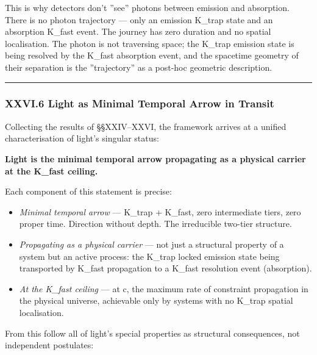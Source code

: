 \documentclass[12pt,a4paper]{article}
\begin{document}
This is why detectors don't ''see'' photons between emission and absorption. There is no photon trajectory --- only an emission K\_trap state and an absorption K\_fast event. The journey has zero duration and no spatial localisation. The photon is not traversing space; the K\_trap emission state is being resolved by the K\_fast absorption event, and the spacetime geometry of their separation is the ''trajectory'' as a post-hoc geometric description.

\begin{center}
\rule{0.5\textwidth}{0.4pt}
\end{center}

\subsubsection{XXVI.6 Light as Minimal Temporal Arrow in Transit}

Collecting the results of §§XXIV--XXVI, the framework arrives at a unified characterisation of light's singular status:

\textbf{Light is the minimal temporal arrow propagating as a physical carrier at the K\_fast ceiling.}

Each component of this statement is precise:

\begin{itemize}
    \item \emph{Minimal temporal arrow} --- K\_trap + K\_fast, zero intermediate tiers, zero proper time. Direction without depth. The irreducible two-tier structure.
    \item \emph{Propagating as a physical carrier} --- not just a structural property of a system but an active process: the K\_trap locked emission state being transported by K\_fast propagation to a K\_fast resolution event (absorption).
    \item \emph{At the K\_fast ceiling} --- at c, the maximum rate of constraint propagation in the physical universe, achievable only by systems with no K\_trap spatial localisation.
\end{itemize}

From this follow all of light's special properties as structural consequences, not independent postulates:
\end{document}
